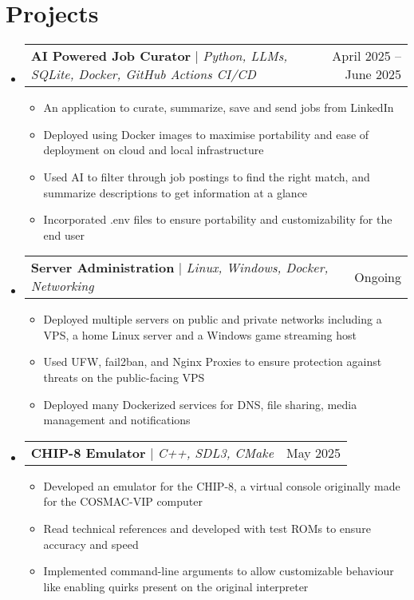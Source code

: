\documentclass[letterpaper,11pt]{article}
\makeatletter
\newcommand{\resumeItem}[1]{
  \item\small{
    {#1 \vspace{-2pt}}
  }
}
\newcommand{\resumeProjectHeading}[2]{
    \item
    \begin{tabular*}{0.97\textwidth}{l@{\extracolsep{\fill}}r}
      \small#1 & #2 \\
    \end{tabular*}\vspace{-7pt}
}
\newcommand{\resumeSubHeadingListStart}{\begin{itemize}[leftmargin=0.15in, label={}]}
\newcommand{\resumeSubHeadingListEnd}{\end{itemize}}
\newcommand{\resumeItemListStart}{\begin{itemize}}
\newcommand{\resumeItemListEnd}{\end{itemize}\vspace{-5pt}}
\makeatother
\begin{document}
\section{Projects}
    \resumeSubHeadingListStart
      \resumeProjectHeading
          {\textbf{AI Powered Job Curator} $|$ \emph{Python, LLMs, SQLite, Docker, GitHub Actions CI/CD}}{April 2025 -- June 2025}
          \resumeItemListStart
            \resumeItem{An application to curate, summarize, save and send jobs from LinkedIn}
            \resumeItem{Deployed using Docker images to maximise portability and ease of deployment on cloud and local infrastructure}
            \resumeItem{Used AI to filter through job postings to find the right match, and summarize descriptions to get information at a glance}
            \resumeItem{Incorporated .env files to ensure portability and customizability for the end user}
          \resumeItemListEnd
      \resumeProjectHeading
          {\textbf{Server Administration} $|$ \emph{Linux, Windows, Docker, Networking}}{Ongoing}
          \resumeItemListStart
            \resumeItem{Deployed multiple servers on public and private networks including a VPS, a home Linux server and a Windows game streaming host}
            \resumeItem{Used UFW, fail2ban, and Nginx Proxies to ensure protection against threats on the public-facing VPS}
            \resumeItem{Deployed many Dockerized services for DNS, file sharing, media management and notifications}
          \resumeItemListEnd
      \resumeProjectHeading
          {\textbf{CHIP-8 Emulator} $|$ \emph{C++, SDL3, CMake}}{May 2025}
          \resumeItemListStart
            \resumeItem{Developed an emulator for the CHIP-8, a virtual console originally made for the COSMAC-VIP computer}
            \resumeItem{Read technical references and developed with test ROMs to ensure accuracy and speed}
            \resumeItem{Implemented command-line arguments to allow customizable behaviour like enabling quirks present on the original interpreter}
          \resumeItemListEnd
    \resumeSubHeadingListEnd
\end{document}
